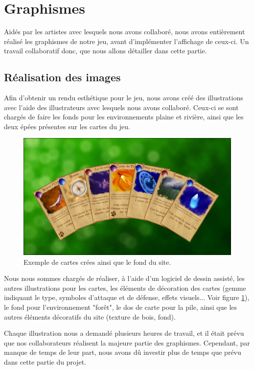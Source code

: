 \documentclass[12pt]{report}
\begin{document}
  \section{Graphismes}
	Aidés par les artistes avec lesquels nous avons collaboré, nous avons entièrement réalisé les graphismes de notre jeu, avant d'implémenter l'affichage de ceux-ci. Un travail collaboratif donc, que nous allons détailler dans cette partie.

    \subsection{Réalisation des images}
		Afin d'obtenir un rendu esthétique pour le jeu, nous avons créé des illustrations avec l'aide des illustrateurs avec lesquels nous avons collaboré. Ceux-ci se sont chargés de faire les fonds pour les environnements plaine et rivière, ainsi que les deux épées présentes sur les cartes du jeu.

    \begin{figure}[h!]
     	\centering
       	\includegraphics[scale=0.45]{images/cards.png}
       	\caption{Exemple de cartes crées ainsi que le fond du site.}
       	\label{fig:cartes}
    \end{figure}

    Nous nous sommes chargés de réaliser, à l'aide d'un logiciel de dessin assisté, les autres illustrations pour les cartes, les éléments de décoration des cartes (gemme indiquant le type, symboles d'attaque et de défense, effets visuels... Voir figure \ref{fig:cartes}), le fond pour l'environnement "forêt", le dos de carte pour la pile, ainsi que les autres éléments décoratifs du site (texture de bois, fond).

    Chaque illustration nous a demandé plusieurs heures de travail, et il était prévu que nos collaborateurs réalisent la majeure partie des graphismes. Cependant, par manque de temps de leur part, nous avons dû investir plus de temps que prévu dans cette partie du projet.
\end{document}
